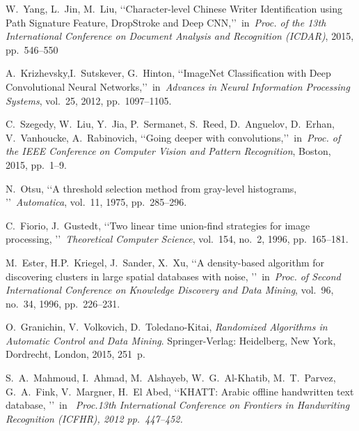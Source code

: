 \documentclass[conference,a4paper]{ieeetran}
\begin{document}
\begin{thebibliography}{99}
 W.~Yang, L.~Jin, M.~Liu, \lq\lq Character-level Chinese Writer Identification using Path Signature Feature, DropStroke and Deep CNN,\rq\rq~in~\emph{Proc. of the 13th International Conference on Document Analysis and Recognition (ICDAR)}, 2015, pp.~546--550

 A.~Krizhevsky,I.~Sutskever, G.~Hinton, \lq\lq ImageNet Classification with Deep Convolutional Neural Networks,\rq\rq~in~\emph{Advances in Neural Information Processing Systems}, vol.~25, 2012, pp.~1097--1105.

 C.~Szegedy, W.~Liu, Y.~Jia, P.~Sermanet, S.~Reed, D.~Anguelov, D.~Erhan, V.~Vanhoucke, A.~Rabinovich, \lq\lq Going deeper with convolutions,\rq\rq~in~\emph{Proc. of the IEEE Conference on Computer Vision and Pattern Recognition}, Boston, 2015, pp.~1--9.

 N.~Otsu, \lq\lq A threshold selection method from gray-level histograms, \rq\rq~\emph{Automatica}, vol.~11, 1975, pp.~285--296.

 C.~Fiorio, J.~Gustedt, \lq\lq Two linear time union-find strategies for image processing, \rq\rq~\emph{Theoretical Computer Science}, vol.~154, no.~2, 1996, pp.~165--181.

 M.~Ester, H.P.~Kriegel, J.~Sander, X.~Xu, \lq\lq A density-based algorithm for discovering clusters in large spatial databases with noise, \rq\rq~in~\emph{Proc. of Second International
Conference on Knowledge Discovery and Data Mining}, vol.~96, no.~34, 1996, pp.~226--231.

 O.~Granichin, V.~Volkovich, D.~Toledano-Kitai, \emph{Randomized Algorithms in Automatic Control and Data Mining}. Springer-Verlag: Heidelberg, New York, Dordrecht, London, 2015, 251~p.

 S.~A.~Mahmoud, I.~Ahmad, M.~Alshayeb, W.~G.~Al-Khatib, M.~T.~Parvez, G.~A.~Fink, V.~Margner, H.~El Abed, \lq\lq KHATT: Arabic offline handwritten text database, \rq\rq~in~\em{ Proc.13th International Conference on Frontiers in Handwriting Recognition (ICFHR)}, 2012 pp.~447--452.

\end{thebibliography}
\end{document}
